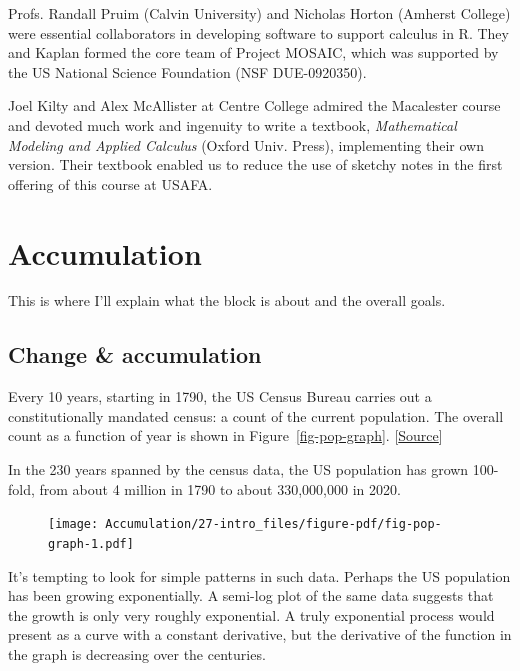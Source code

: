 \documentclass[
  letterpaper,
  DIV=11,
  numbers=noendperiod,
  oneside]{scrreprt}
\begin{document}
Profs. Randall Pruim (Calvin University) and Nicholas Horton (Amherst
College) were essential collaborators in developing software to support
calculus in R. They and Kaplan formed the core team of Project MOSAIC,
which was supported by the US National Science Foundation (NSF
DUE-0920350).

Joel Kilty and Alex McAllister at Centre College admired the Macalester
course and devoted much work and ingenuity to write a textbook,
\emph{Mathematical Modeling and Applied Calculus} (Oxford Univ. Press),
implementing their own version. Their textbook enabled us to reduce the
use of sketchy notes in the first offering of this course at USAFA.

\part{Accumulation}

This is where I'll explain what the block is about and the overall
goals.

\hypertarget{sec-change-accumulation}{%
\chapter{Change \& accumulation}\label{sec-change-accumulation}}

Every 10 years, starting in 1790, the US Census Bureau carries out a
constitutionally mandated census: a count of the current population. The
overall count as a function of year is shown in
Figure~\ref{fig-pop-graph}.
{[}\href{https://en.wikipedia.org/wiki/Demographic_history_of_the_United_States}{Source}{]}

In the 230 years spanned by the census data, the US population has grown
100-fold, from about 4 million in 1790 to about 330,000,000 in 2020.

\begin{figure}


{\centering \texttt{[image: Accumulation/27-intro\_files/figure-pdf/fig-pop-graph-1.pdf]}

}

\end{figure}

It's tempting to look for simple patterns in such data. Perhaps the US
population has been growing exponentially. A semi-log plot of the same
data suggests that the growth is only very roughly exponential. A truly
exponential process would present as a curve with a constant derivative,
but the derivative of the function in the graph is decreasing over the
centuries.
\end{document}
